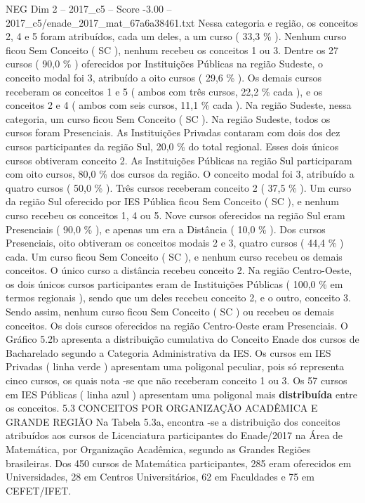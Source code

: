 \begin{textsample}{NEG Dim 2 – 2017\_c5 – Score -3.00 – 2017\_c5/enade\_2017\_mat\_67a6a38461.txt}
Nessa categoria e região, os conceitos 2, 4 e 5 foram atribuídos, cada um deles, a um curso ( 33,3 \% ).
Nenhum curso ficou Sem Conceito ( SC ), nenhum recebeu os conceitos 1 ou 3.
Dentre os 27 cursos ( 90,0 \% ) oferecidos por Instituições Públicas na região Sudeste, o conceito modal foi 3, atribuído a oito cursos ( 29,6 \% ).
Os demais cursos receberam os conceitos 1 e 5 ( ambos com três cursos, 22,2 \% cada ), e os conceitos 2 e 4 ( ambos com seis cursos, 11,1 \% cada ).
Na região Sudeste, nessa categoria, um curso ficou Sem Conceito ( SC ).
Na região Sudeste, todos os cursos foram Presenciais.
As Instituições Privadas contaram com dois dos dez cursos participantes da região Sul, 20,0 \% do total regional.
Esses dois únicos cursos obtiveram conceito 2.
As Instituições Públicas na região Sul participaram com oito cursos, 80,0 \% dos cursos da região.
O conceito modal foi 3, atribuído a quatro cursos ( 50,0 \% ).
Três cursos receberam conceito 2 ( 37,5 \% ).
Um curso da região Sul oferecido por IES Pública ficou Sem Conceito ( SC ), e nenhum curso recebeu os conceitos 1, 4 ou 5.
Nove cursos oferecidos na região Sul eram Presenciais ( 90,0 \% ), e apenas um era a Distância ( 10,0 \% ).
Dos cursos Presenciais, oito obtiveram os conceitos modais 2 e 3, quatro cursos ( 44,4 \% ) cada.
Um curso ficou Sem Conceito ( SC ), e nenhum curso recebeu os demais conceitos.
O único curso a distância recebeu conceito 2.
Na região Centro-Oeste, os dois únicos cursos participantes eram de Instituições Públicas ( 100,0 \% em termos regionais ), sendo que um deles recebeu conceito 2, e o outro, conceito 3.
Sendo assim, nenhum curso ficou Sem Conceito ( SC ) ou recebeu os demais conceitos.
Os dois cursos oferecidos na região Centro-Oeste eram Presenciais.
O Gráfico 5.2b apresenta a distribuição cumulativa do Conceito Enade dos cursos de Bacharelado segundo a Categoria Administrativa da IES.
Os cursos em IES Privadas ( linha verde ) apresentam uma poligonal peculiar, pois só representa cinco cursos, os quais nota -se que não receberam conceito 1 ou 3.
Os 57 cursos em IES Públicas ( linha azul ) apresentam uma poligonal mais \textbf{distribuída} entre os conceitos. 5.3 CONCEITOS POR ORGANIZAÇÃO ACADÊMICA E GRANDE REGIÃO Na Tabela 5.3a, encontra -se a distribuição dos conceitos atribuídos aos cursos de Licenciatura participantes do Enade/2017 na Área de Matemática, por Organização Acadêmica, segundo as Grandes Regiões brasileiras.
Dos 450 cursos de Matemática participantes, 285 eram oferecidos em Universidades, 28 em Centros Universitários, 62 em Faculdades e 75 em CEFET/IFET.

\end{textsample}
